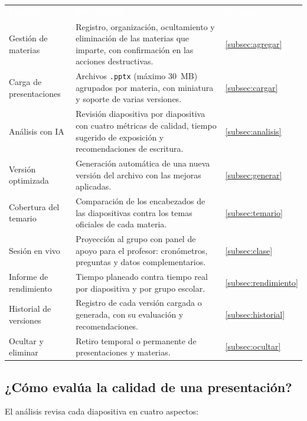 \documentclass[11pt]{article}
\newcommand{\encabezado}[1]{\textcolor{white}{\sffamily\bfseries #1}}
\begin{document}
\begin{center}
\small
\begin{tabularx}{\linewidth}{>{\raggedright\arraybackslash}p{4.6cm} X C{1.9cm}}
\encabezado{Función} & \encabezado{Descripción} & \encabezado{Sección} \\
Gestión de materias & Registro, organización, ocultamiento y eliminación de las materias que imparte, con confirmación en las acciones destructivas. & \ref{subsec:agregar} \\
Carga de presentaciones & Archivos \texttt{.pptx} (máximo 30~MB) agrupados por materia, con miniatura y soporte de varias versiones. & \ref{subsec:cargar} \\
Análisis con IA & Revisión diapositiva por diapositiva con cuatro métricas de calidad, tiempo sugerido de exposición y recomendaciones de escritura. & \ref{subsec:analisis} \\
Versión optimizada & Generación automática de una nueva versión del archivo con las mejoras aplicadas. & \ref{subsec:generar} \\
Cobertura del temario & Comparación de los encabezados de las diapositivas contra los temas oficiales de cada materia. & \ref{subsec:temario} \\
Sesión en vivo & Proyección al grupo con panel de apoyo para el profesor: cronómetros, preguntas y datos complementarios. & \ref{subsec:clase} \\
Informe de rendimiento & Tiempo planeado contra tiempo real por diapositiva y por grupo escolar. & \ref{subsec:rendimiento} \\
Historial de versiones & Registro de cada versión cargada o generada, con su evaluación y recomendaciones. & \ref{subsec:historial} \\
Ocultar y eliminar & Retiro temporal o permanente de presentaciones y materias. & \ref{subsec:ocultar} \\
\end{tabularx}
\end{center}

\subsection{¿Cómo evalúa la calidad de una presentación?}
\label{subsec:metricas}

El análisis revisa cada diapositiva en cuatro aspectos:
\end{document}
